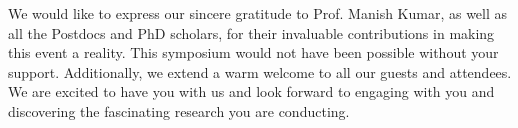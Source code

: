 We would like to express our sincere gratitude to Prof. Manish Kumar, as well as all the Postdocs and PhD scholars, for their invaluable contributions in making this event a reality. This symposium would not have been possible without your support. Additionally, we extend a warm welcome to all our guests and attendees. We are excited to have you with us and look forward to engaging with you and discovering the fascinating research you are conducting.
